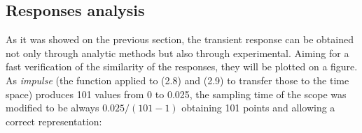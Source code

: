 \documentclass[a4paper,12pt]{article}
\begin{document}
\subsection{Responses analysis}

\vspace{0.5cm}

As it was showed on the previous section, the transient response can be obtained not only through analytic methods but also through experimental. Aiming for a fast verification of the similarity of the responses, they will be plotted on a figure. As \textit{impulse} (the function applied to (2.8) and (2.9) to transfer those to the time space) produces 101 values from 0 to 0.025, the sampling time of the scope was modified to be always $0.025/(101-1)$ obtaining 101 points and allowing a correct representation:

\vspace{0.5cm}
\end{document}
